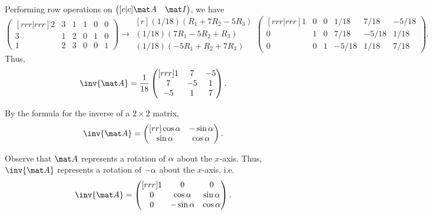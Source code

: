 \begin{solution}
    \begin{ppart}
        Performing row operations on $\begin{pmatrix}[c|c]\mat A & \mat I\end{pmatrix}$, we have \[\begin{pmatrix}[rrr|rrr]2 & 3 & 1 & 1 & 0 & 0 \\ 3 & 1 & 2 & 0 & 1 & 0 \\ 1 & 2 & 3 & 0 & 0 & 1\end{pmatrix} \rightarrow \begin{matrix}[r] \scriptstyle (1/18) (R_1 + 7R_2 - 5R_3) \\[0.4em] \scriptstyle (1/18) (7R_1 - 5R_2 + R_3) \\[0.4em] \scriptstyle (1/18) (-5R_1 + R_2 + 7R_3)\end{matrix} \begin{pmatrix}[rrr|rrr] 1 & 0 & 0 & 1/18 & 7/18 & -5/18 \\[0.4em] 0 & 1 & 0 & 7/18 & -5/18 & 1/18 \\[0.4em] 0 & 0 & 1 & -5/18 & 1/18 & 7/18\end{pmatrix}.\] Thus, \[\inv{\mat A} = \frac1{18} \begin{pmatrix}[rrr]1 & 7 & -5 \\ 7 & -5 & 1 \\ -5 & 1 & 7\end{pmatrix}.\]
    \end{ppart}
    \begin{ppart}
        By the formula for the inverse of a $2 \times 2$ matrix, \[\inv{\mat A} = \begin{pmatrix}[rr]\cos \a & -\sin \a \\ \sin \a & \cos \a\end{pmatrix}.\]
    \end{ppart}
    \begin{ppart}
        Observe that $\mat A$ represents a rotation of $\alpha$ about the $x$-axis. Thus, $\inv{\mat A}$ represents a rotation of $-\alpha$ about the $x$-axis, i.e. \[\inv{\mat A} = \begin{pmatrix}[rrr]1 & 0 & 0\\0 & \cos \a & \sin \a\\0 & -\sin \a & \cos \a\end{pmatrix}.\]
    \end{ppart}
\end{solution}

